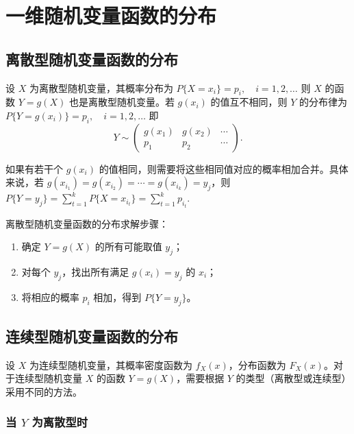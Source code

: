 \documentclass[lang=cn,11pt]{elegantbook}
\begin{document}
\section{一维随机变量函数的分布} \label{sec:random-variable-function}

\subsection{离散型随机变量函数的分布} \label{subsec:discrete-to-discrete}

设 $X$ 为离散型随机变量，其概率分布为
\(
P\{X = x_i\} = p_i,\quad i=1,2,\dots
\)
则 $X$ 的函数 $Y = g(X)$ 也是离散型随机变量。若 $g(x_i)$ 的值互不相同，则 $Y$ 的分布律为
\(
P\{Y = g(x_i)\} = p_i,\quad i=1,2,\dots
\)
即
\[
Y \sim \begin{pmatrix} g(x_1) & g(x_2) & \cdots \\ p_1 & p_2 & \cdots \end{pmatrix}.
\]

如果有若干个 $g(x_i)$ 的值相同，则需要将这些相同值对应的概率相加合并。具体来说，若 $g(x_{i_1}) = g(x_{i_2}) = \cdots = g(x_{i_k}) = y_j$，则
\(
P\{Y = y_j\} = \sum_{t=1}^{k} P\{X = x_{i_t}\} = \sum_{t=1}^{k} p_{i_t}.
\)

\begin{property}\label{prop:discrete-function}
离散型随机变量函数的分布求解步骤：
\begin{enumerate}
    \item 确定 $Y = g(X)$ 的所有可能取值 $y_j$；
    \item 对每个 $y_j$，找出所有满足 $g(x_i) = y_j$ 的 $x_i$；
    \item 将相应的概率 $p_i$ 相加，得到 $P\{Y = y_j\}$。
\end{enumerate}
\end{property}

\subsection{连续型随机变量函数的分布} \label{subsec:continuous-function}

设 $X$ 为连续型随机变量，其概率密度函数为 $f_X(x)$，分布函数为 $F_X(x)$。对于连续型随机变量 $X$ 的函数 $Y = g(X)$，需要根据 $Y$ 的类型（离散型或连续型）采用不同的方法。

\subsubsection{当 \texorpdfstring{$Y$}{Y} 为离散型时}
\end{document}
